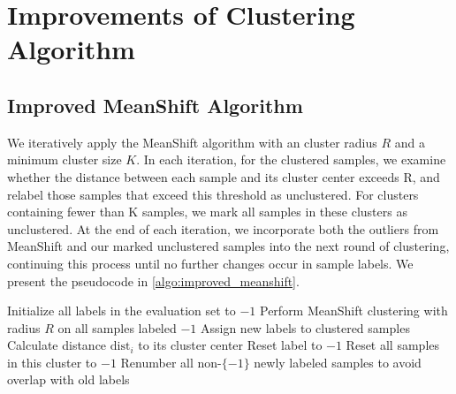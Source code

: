 \section{Improvements of Clustering Algorithm}
\label{sec:clustering_opt}
\subsection{Improved MeanShift Algorithm}
\label{sec:improved}
We iteratively apply the MeanShift algorithm with an  cluster radius $R$ and a minimum cluster size $K$. 
In each iteration, for the clustered samples, we examine whether the distance between each sample and its cluster center exceeds R, and relabel those samples that exceed this threshold as unclustered. 
For clusters containing fewer than K samples, we mark all samples in these clusters as unclustered. 
At the end of each iteration, we incorporate both the outliers from MeanShift and our marked unclustered samples into the next round of clustering, continuing this process until no further changes occur in sample labels. We present the pseudocode in \cref{algo:improved_meanshift}.

\begin{algorithm}
\caption{Iterative MeanShift Clustering Algorithm}
\label{algo:improved_meanshift}
\begin{algorithmic}[1]
\State {}
\State Initialize all labels in the evaluation set to $-1$
\Repeat
    \State Perform MeanShift clustering with radius $R$ on all samples labeled $-1$
    \State Assign new labels to clustered samples
        \State Calculate distance $\mathrm{dist}_i$ to its cluster center
            \State Reset label to $-1$
        \EndIf
    \EndFor
            \State Reset all samples in this cluster to $-1$
        \EndIf
    \EndFor
    \State Renumber all non-$\{-1\}$ newly labeled samples to avoid overlap with old labels
\end{algorithmic}
\end{algorithm}

